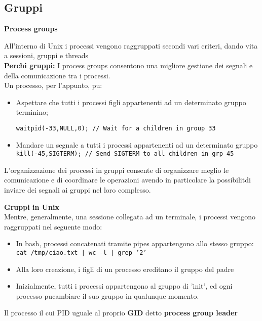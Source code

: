 \subsection{Gruppi}
\begin{flushleft}
  \textbf{Process groups} \par 
  All'interno di Unix i processi vengono raggruppati secondi vari criteri, dando vita a 
  sessioni, gruppi e threads\\
  \textbf{Perch\ace i gruppi:} I process groups consentono una migliore gestione dei segnali e della comunicazione 
  tra i processi.\\
  Un processo, per l'appunto, pu\aco:
  \begin{itemize}
    \item Aspettare che tutti i processi figli appartenenti ad un determinato gruppo
    terminino;\par
    \texttt{waitpid(-33,NULL,0); // Wait for a children in group 33}
    \item Mandare un segnale a tutti i processi appartenenti ad un determinato gruppo\\
    \texttt{kill(-45,SIGTERM); // Send SIGTERM to all children in grp 45}
  \end{itemize}
  L'organizzazione dei processi in gruppi consente di organizzare meglio le 
  comunicazione e di coordinare le operazioni avendo in particolare la possibilit\aca di 
  inviare dei segnali ai gruppi nel loro complesso.
  \begin{flushleft}
    \textbf{Gruppi in Unix}\\
    Mentre, generalmente, una sessione \ace collegata ad un terminale, i processi vengono 
    raggruppati nel seguente modo:
    \begin{itemize}
      \item In bash, processi concatenati tramite pipes appartengono allo stesso gruppo: \\
            \texttt{cat /tmp/ciao.txt | wc -l | grep '2'}
      \item Alla loro creazione, i figli di un processo ereditano il gruppo del padre
      \item Inizialmente, tutti i processi appartengono al gruppo di 'init', ed ogni processo 
            pu\aco cambiare il suo gruppo in qualunque momento.  
    \end{itemize}
    Il processo il cui PID \ace uguale al proprio \textbf{GID} \ace detto \textbf{process group leader}
  \end{flushleft}

\end{flushleft}
